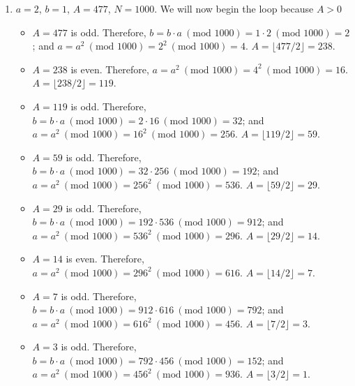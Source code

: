 {\begin{enumerate}
\begin{itemize}
                  \item \(A = 1\) is odd. Therefore, \(b = b \cdot a \ (\text{mod } 256) = 113 \cdot 1 \ (\text{mod } 256) = 113\); and \(a = a^2 \ (\text{mod } 256) = 1^2 \ (\text{mod 256}) = 1\). \(A = \lfloor 1 / 2 \rfloor = 0\).
              \end{itemize}
              Since \(A = 0\), we can report the value of \(b\), which is \(113\). Hence, \(17^183 \ (\text{mod }256) = 113\).
        \item \(a = 2\), \(b = 1\), \(A = 477\), \(N = 1000\). We will now begin the loop because \(A > 0\)
              \begin{itemize}
                  \item \(A = 477\) is odd. Therefore, \(b = b \cdot a \ (\text{mod } 1000) = 1 \cdot 2 \ (\text{mod } 1000) = 2\); and \(a = a^2 \ (\text{mod } 1000) = 2^2 \ (\text{mod } 1000) = 4\). \(A = \lfloor 477 / 2 \rfloor = 238\).
                  \item \(A = 238\) is even. Therefore, \(a = a^2 \ (\text{mod } 1000) = 4^2 \ (\text{mod } 1000) = 16\). \(A = \lfloor 238 / 2 \rfloor = 119\).
                  \item \(A = 119\) is odd. Therefore, \(b = b \cdot a \ (\text{mod } 1000) = 2 \cdot 16 \ (\text{mod } 1000) = 32\); and \(a = a^2 \ (\text{mod } 1000) = 16^2 \ (\text{mod } 1000) = 256\). \(A = \lfloor 119 / 2 \rfloor = 59\).
                  \item \(A = 59\) is odd. Therefore, \(b = b \cdot a \ (\text{mod } 1000) = 32 \cdot 256 \ (\text{mod } 1000) = 192\); and \(a = a^2 \ (\text{mod } 1000) = 256^2 \ (\text{mod } 1000) = 536\). \(A = \lfloor 59 / 2 \rfloor = 29\).
                  \item \(A = 29\) is odd. Therefore, \(b = b \cdot a \ (\text{mod } 1000) = 192 \cdot 536 \ (\text{mod } 1000) = 912\); and \(a = a^2 \ (\text{mod } 1000) = 536^2 \ (\text{mod } 1000) = 296\). \(A = \lfloor 29 / 2 \rfloor = 14\).
                  \item \(A = 14\) is even. Therefore, \(a = a^2 \ (\text{mod } 1000) = 296^2 \ (\text{mod } 1000) = 616\). \(A = \lfloor 14 / 2 \rfloor = 7\).
                  \item \(A = 7\) is odd. Therefore, \(b = b \cdot a \ (\text{mod } 1000) = 912 \cdot 616 \ (\text{mod } 1000) = 792\); and \(a = a^2 \ (\text{mod } 1000) = 616^2 \ (\text{mod } 1000) = 456\). \(A = \lfloor 7 / 2 \rfloor = 3\).
                  \item \(A = 3\) is odd. Therefore, \(b = b \cdot a \ (\text{mod } 1000) = 792 \cdot 456 \ (\text{mod } 1000) = 152\); and \(a = a^2 \ (\text{mod } 1000) = 456^2 \ (\text{mod } 1000) = 936\). \(A = \lfloor 3 / 2 \rfloor = 1\).

\end{itemize}
\end{enumerate}}
